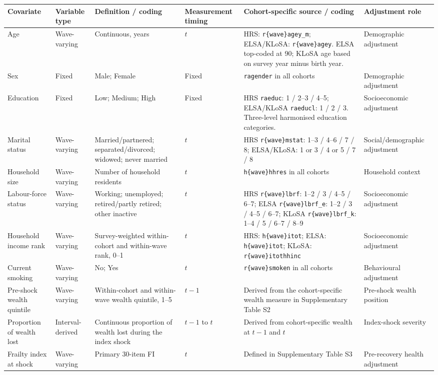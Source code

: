 \begin{landscape}
\fontsize{9}{10.5}\selectfont
\setlength{\tabcolsep}{2.4pt}
\renewcommand{\arraystretch}{1.10}

\label{tab:s4_covariates}

\begin{tabularx}{\linewidth}{@{}L{2.75cm}L{2.15cm}L{4.65cm}L{2.25cm}L{9.25cm}Y@{}}
\toprule
Covariate & Variable type & Definition / coding & Measurement timing & Cohort-specific source / coding & Adjustment role \\
\midrule
Age & Wave-varying & Continuous, years & $t$ & HRS: \texttt{r\{wave\}agey\_m}; ELSA/KLoSA: \texttt{r\{wave\}agey}. ELSA top-coded at 90; KLoSA age based on survey year minus birth year. & Demographic adjustment \\
Sex & Fixed & Male; Female & Fixed & \texttt{ragender} in all cohorts & Demographic adjustment \\
Education & Fixed & Low; Medium; High & Fixed & HRS \texttt{raeduc}: 1 / 2--3 / 4--5; ELSA/KLoSA \texttt{raeducl}: 1 / 2 / 3. Three-level harmonised education categories. & Socioeconomic adjustment \\
Marital status & Wave-varying & Married/partnered; separated/divorced; widowed; never married & $t$ & HRS \texttt{r\{wave\}mstat}: 1--3 / 4--6 / 7 / 8; ELSA/KLoSA: 1 or 3 / 4 or 5 / 7 / 8 & Social/demographic adjustment \\
Household size & Wave-varying & Number of household residents & $t$ & \texttt{h\{wave\}hhres} in all cohorts & Household context \\
Labour-force status & Wave-varying & Working; unemployed; retired/partly retired; other inactive & $t$ & HRS \texttt{r\{wave\}lbrf}: 1--2 / 3 / 4--5 / 6--7; ELSA \texttt{r\{wave\}lbrf\_e}: 1--2 / 3 / 4--5 / 6--7; KLoSA \texttt{r\{wave\}lbrf\_k}: 1--4 / 5 / 6--7 / 8--9 & Socioeconomic adjustment \\
Household income rank & Wave-varying & Survey-weighted within-cohort and within-wave rank, 0--1 & $t$ & HRS: \texttt{h\{wave\}itot}; ELSA: \texttt{h\{wave\}itot}; KLoSA: \texttt{r\{wave\}itothhinc} & Socioeconomic adjustment \\
Current smoking & Wave-varying & No; Yes & $t$ & \texttt{r\{wave\}smoken} in all cohorts & Behavioural adjustment \\
Pre-shock wealth quintile & Wave-varying & Within-cohort and within-wave wealth quintile, 1--5 & $t-1$ & Derived from the cohort-specific wealth measure in Supplementary Table S2 & Pre-shock wealth position \\
Proportion of wealth lost & Interval-derived & Continuous proportion of wealth lost during the index shock & $t-1$ to $t$ & Derived from cohort-specific wealth at $t-1$ and $t$ & Index-shock severity \\
Frailty index at shock & Wave-varying & Primary 30-item FI & $t$ & Defined in Supplementary Table S3 & Pre-recovery health adjustment \\
\bottomrule
\end{tabularx}


\end{landscape}
